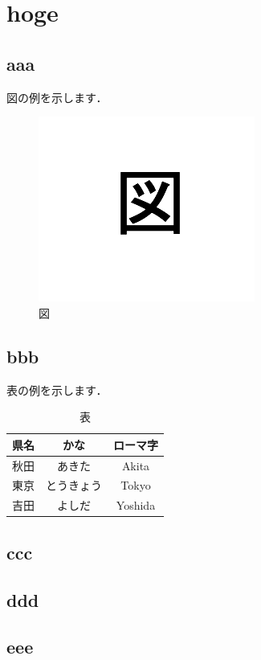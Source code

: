 \chapter{hoge}
\label{chap:hoge}

\section{aaa}

図の例を示します．

\begin{figure}[htbp]
  \begin{center}
    \includegraphics{figure/figure_example.png}
    \caption{図}
    \label{fig:figure_example}
  \end{center}
\end{figure}

\section{bbb}

表の例を示します．

\begin{table}[htb]
  \begin{center}
    \caption{表}
    \begin{tabular}{|c|c|c|} \hline
      県名 & かな & ローマ字 \\ \hline \hline
      秋田 & あきた & Akita \\
      東京 & とうきょう & Tokyo \\
      吉田 & よしだ & Yoshida \\ \hline
    \end{tabular}
    \label{tab:prefecture}
  \end{center}
\end{table}

\section{ccc}

\section{ddd}

\section{eee}


